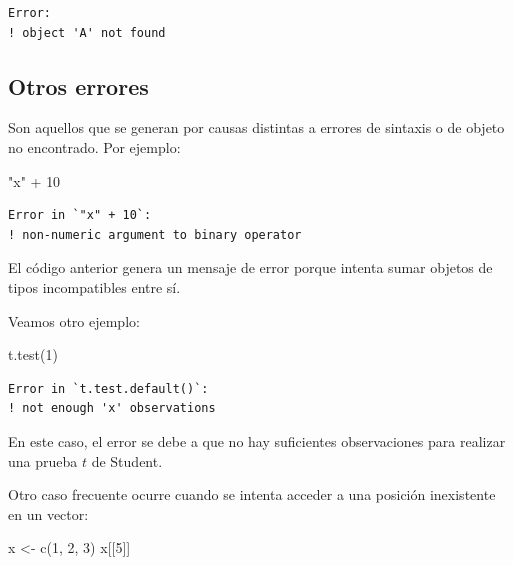 \documentclass[
  spanish,
  letterpaper,
  DIV=11,
  numbers=noendperiod]{scrreprt}
\newenvironment{Shaded}{\begin{snugshade}}{\end{snugshade}}
\newcommand{\DecValTok}[1]{\textcolor[rgb]{0.68,0.00,0.00}{#1}}
\newcommand{\FunctionTok}[1]{\textcolor[rgb]{0.28,0.35,0.67}{#1}}
\newcommand{\NormalTok}[1]{\textcolor[rgb]{0.00,0.23,0.31}{#1}}
\newcommand{\OtherTok}[1]{\textcolor[rgb]{0.00,0.23,0.31}{#1}}
\newcommand{\SpecialCharTok}[1]{\textcolor[rgb]{0.37,0.37,0.37}{#1}}
\newcommand{\StringTok}[1]{\textcolor[rgb]{0.13,0.47,0.30}{#1}}
\begin{document}
\begin{verbatim}
Error:
! object 'A' not found
\end{verbatim}

\subsection{Otros errores}\label{otros-errores}

Son aquellos que se generan por causas distintas a errores de sintaxis o
de objeto no encontrado. Por ejemplo:

\begin{Shaded}
\begin{Highlighting}[]
\StringTok{"x"} \SpecialCharTok{+} \DecValTok{10}
\end{Highlighting}
\end{Shaded}

\begin{verbatim}
Error in `"x" + 10`:
! non-numeric argument to binary operator
\end{verbatim}

El código anterior genera un mensaje de error porque intenta sumar
objetos de tipos incompatibles entre sí.

Veamos otro ejemplo:

\begin{Shaded}
\begin{Highlighting}[]
\FunctionTok{t.test}\NormalTok{(}\DecValTok{1}\NormalTok{)}
\end{Highlighting}
\end{Shaded}

\begin{verbatim}
Error in `t.test.default()`:
! not enough 'x' observations
\end{verbatim}

En este caso, el error se debe a que no hay suficientes observaciones
para realizar una prueba \(t\) de Student.

Otro caso frecuente ocurre cuando se intenta acceder a una posición
inexistente en un vector:

\begin{Shaded}
\begin{Highlighting}[]
\NormalTok{x }\OtherTok{\textless{}{-}} \FunctionTok{c}\NormalTok{(}\DecValTok{1}\NormalTok{, }\DecValTok{2}\NormalTok{, }\DecValTok{3}\NormalTok{)}
\NormalTok{x[[}\DecValTok{5}\NormalTok{]]}
\end{Highlighting}
\end{Shaded}
\end{document}
